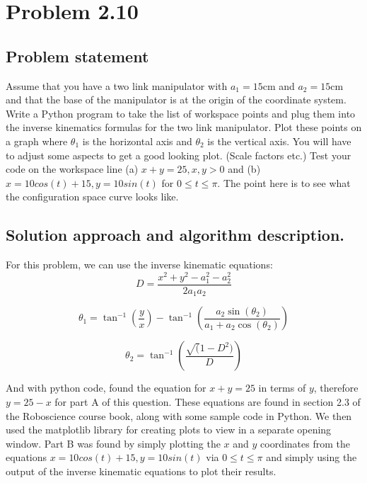 \documentclass[letterpaper,11pt]{texMemo} %
\begin{document}
\maketitle %


\section*{Problem 2.10}
\subsection*{Problem statement}
Assume that you have a two link manipulator with $a_1=15$cm and $a_2=15$cm and that the base of the manipulator is at
the origin of the coordinate system. Write a Python program to take the list of workspace points and plug them into the
inverse kinematics formulas for the two link manipulator. Plot these points on a graph where $\theta_1$ is the horizontal
axis and $\theta_2$ is the vertical axis. You will have to adjust some aspects to get a good looking plot.
(Scale factors etc.) Test your code on the workspace line (a) $x+y=25, x,y>0$ and (b) $x=10cos(t)+15, y=10sin(t)$ for $0 \leq t \leq\pi$.
The point here is to see what the configuration space curve looks like.

\subsection*{Solution approach and algorithm description.}
For this problem, we can use the inverse kinematic equations: 
\[
    D = \frac{x^2+y^2-a^2_1-a^2_2}{2a_1 a_2}
\]

\[
    \theta_1 = \tan^{-1}(\frac{y}{x})-\tan^{-1}(\frac{a_2 \sin(\theta_2)}{a_1+a_2 \cos(\theta_2)})
\]

\[
    \theta_2 = \tan^{-1}(\frac{\sqrt(1-D^2)}{D})
\]

And with python code, found the equation for $x+y=25$ in terms of $y$, therefore $y=25-x$ for part A of this question.
These equations are found in section 2.3 of the Roboscience course book, along with some sample code in Python.
We then used the matplotlib library for creating plots to view in a separate opening window. Part B was found by 
simply plotting the $x$ and $y$ coordinates from the equations $x=10cos(t)+15, y=10sin(t)$ via $0 \leq t \leq\pi$ 
and simply using the output of the inverse kinematic equations to plot their results.
\end{document}
